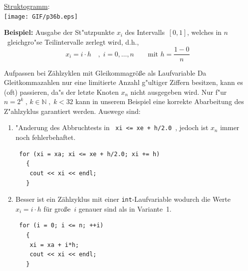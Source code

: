 \begin{minipage}{0.4\textwidth}
\underline{Struktogramm}: \\
\texttt{[image: GIF/p36b.eps]}
\end{minipage}
%
\begin{minipage}{0.5\textwidth}
\textbf{Beispiel:} Ausgabe der St"utzpunkte $x_i$ des Intervalls~$[0,1]$,
welches in $n$~gleichgro"se Teilintervalle zerlegt wird, d.h.,
$$
 x_i = i \cdot h \quad,\;i=0,\ldots,n\qquad\text{mit } h = \frac{1-0}{n}
$$
\end{minipage}
%
{Aufpassen bei Zählzyklen mit Gleikommagröße als Laufvariable}
%
Da Gleitkommazahlen nur eine limitierte Anzahl g"ultiger Ziffern besitzen,
kann es (oft) passieren, da"s der letzte Knoten $x_n$ nicht
ausgegeben wird. Nur f"ur $n=2^k\;,\,k\in {\mathbb{N}}\;,\;k<32$ kann in unserem
Beispiel eine korrekte Abarbeitung des Z"ahlzyklus garantiert werden.
Auswege sind: 
\begin{enumerate}
 \item "Anderung des Abbruchtests in \verb| xi <= xe + h/2.0 |, jedoch
 	ist $x_n$ immer noch fehlerbehaftet. \\[1ex]
%
\begin{minipage} {0.5\textwidth}
\begin{verbatim}
 for (xi = xa; xi <= xe + h/2.0; xi += h)
   {
    cout << xi << endl;
   }
\end{verbatim}
\end{minipage}
 \item Besser ist ein Zählzyklus mit einer \verb|int|-Laufvariable wodurch
    die Werte $x_{i} = i \cdot h$ für große~$i$ genauer sind als in Variante~1.
    \\[2ex]
\nopagebreak
\begin{minipage} {0.5\textwidth}
\begin{verbatim}
 for (i = 0; i <= n; ++i)
   {
    xi = xa + i*h;
    cout << xi << endl;
   }
\end{verbatim}
\end{minipage}
\end{enumerate}

